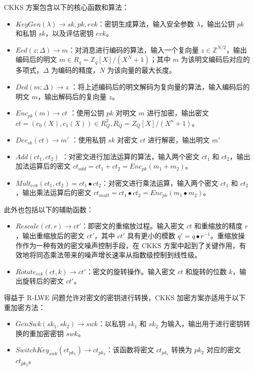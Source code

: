 CKKS 方案包含以下的核心函数和算法：

\begin{itemize}
    \item $KeyGen(\lambda) \rightarrow sk, pk, evk$：密钥生成算法，输入安全参数 $\lambda$，输出公钥 $pk$ 和私钥 $sk$，以及评估密钥 $evk$。
    \item $Ecd(z; \Delta) \rightarrow m$：对消息进行编码的算法，输入一个复向量 $z \in \mathbb{Z}^{N/2}$，输出编码后的明文 $m \in R_q = \mathbb{Z}_q[X]/(X^N+1)$；其中 $m$ 为该明文编码后对应的多项式，$\Delta$ 为编码的精度，$N$ 为该向量的最大长度。
    \item $Dcd(m; \Delta) \rightarrow z$ ：将上述编码后的明文解码为复向量的算法，输入编码后的明文 $m$，输出解码后的复向量 $z$。
    \item $Enc_{pk}(m) \rightarrow ct$ ：使用公钥 $pk$ 对明文 $m$ 进行加密，输出密文 $ct = (c_0(X),c_1(X)) \in R_Q^2, R_Q = Z_Q[X]/(X^n + 1)$。
    \item $Dec_{sk}(ct) \rightarrow m'$ ：使用私钥 $sk$ 对密文 $ct$ 进行解密，输出明文 $m'$
    \item $Add(ct_1, ct_2)$ ：对密文进行加法运算的算法，输入两个密文 $ct_1$ 和 $ct_2$，输出加法运算后的密文 $ct_{add} = ct_1 + ct_2 = Enc_{pk}(m_1 + m_2)$。
    \item $Mult_{evk}(ct_1, ct_2) = ct_1 \bullet ct_2$：对密文进行乘法运算，输入两个密文 $ct_1$ 和 $ct_2$，输出乘法运算后的密文 $ct_{mult} = ct_1 \bullet ct_2 = Enc_{pk}(m_1 \bullet m_2)$。
\end{itemize}

此外也包括以下的辅助函数：

\begin{itemize}
    \item $Rescale(ct, r) \rightarrow ct'$：即密文的重缩放过程。输入密文 $ct$ 和重缩放的精度 $r$，输出重缩放后的密文 $ct'$，其中 $ct'$ 具有更小的模数 $q' = q \bullet r^{-1}$。重缩放操作作为一种有效的密文噪声控制手段，在 CKKS 方案中起到了关键作用，有效地将同态乘法带来的噪声增长速率从指数级控制到线性级。
    \item $Rotate_{evk}(ct, k) \rightarrow ct'$：密文的旋转操作。输入密文 $ct$ 和旋转的位数 $k$，输出旋转后的密文 $ct'$。
\end{itemize}

得益于 R-LWE 问题允许对密文的密钥进行转换\cite{brakerski2014leveled}，CKKS 加密方案亦适用于以下重加密方法：

\begin{itemize}
    \item $GenSwk(sk_1, sk_2) \rightarrow swk$：以私钥 $sk_1$ 和 $sk_2$ 为输入，输出用于进行密钥转换的重加密密钥 $swk$。
    \item $SwitchKey_{swk}(ct_{pk_1}) \rightarrow ct_{pk_2}$：该函数将密文 $ct_{pk_1}$ 转换为 $pk_2$ 对应的密文 $ct_{pk_2}$。
\end{itemize}

